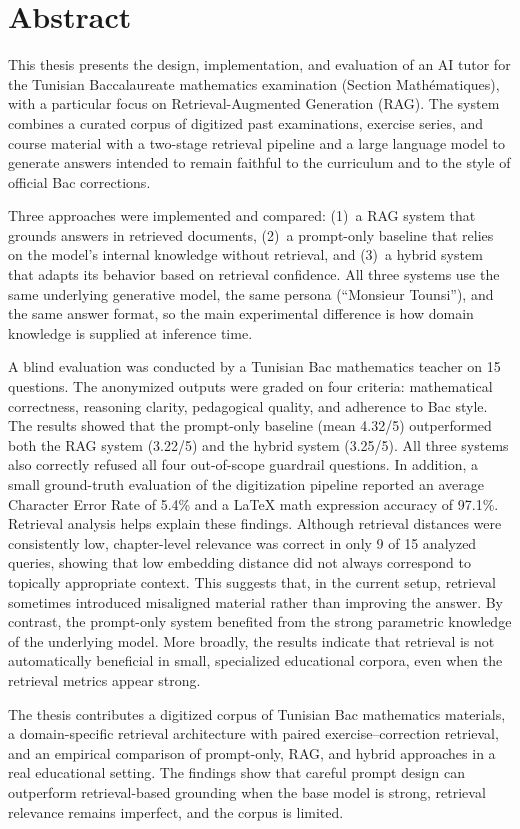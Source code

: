 \chapter*{Abstract}

This thesis presents the design, implementation, and evaluation of an AI tutor for the Tunisian Baccalaureate mathematics examination (Section Math\'{e}matiques), with a particular focus on Retrieval-Augmented Generation (RAG). The system combines a curated corpus of digitized past examinations, exercise series, and course material with a two-stage retrieval pipeline and a large language model to generate answers intended to remain faithful to the curriculum and to the style of official Bac corrections.

Three approaches were implemented and compared: (1)~a RAG system that grounds answers in retrieved documents, (2)~a prompt-only baseline that relies on the model's internal knowledge without retrieval, and (3)~a hybrid system that adapts its behavior based on retrieval confidence. All three systems use the same underlying generative model, the same persona (``Monsieur Tounsi''), and the same answer format, so the main experimental difference is how domain knowledge is supplied at inference time.

A blind evaluation was conducted by a Tunisian Bac mathematics teacher on 15 questions. The anonymized outputs were graded on four criteria: mathematical correctness, reasoning clarity, pedagogical quality, and adherence to Bac style. The results showed that the prompt-only baseline (mean 4.32/5) outperformed both the RAG system (3.22/5) and the hybrid system (3.25/5). All three systems also correctly refused all four out-of-scope guardrail questions. In addition, a small ground-truth evaluation of the digitization pipeline reported an average Character Error Rate of 5.4\% and a \LaTeX{} math expression accuracy of 97.1\%. Retrieval analysis helps explain these findings. Although retrieval distances were consistently low, chapter-level relevance was correct in only 9 of 15 analyzed queries, showing that low embedding distance did not always correspond to topically appropriate context. This suggests that, in the current setup, retrieval sometimes introduced misaligned material rather than improving the answer. By contrast, the prompt-only system benefited from the strong parametric knowledge of the underlying model. More broadly, the results indicate that retrieval is not automatically beneficial in small, specialized educational corpora, even when the retrieval metrics appear strong.

The thesis contributes a digitized corpus of Tunisian Bac mathematics materials, a domain-specific retrieval architecture with paired exercise--correction retrieval, and an empirical comparison of prompt-only, RAG, and hybrid approaches in a real educational setting. The findings show that careful prompt design can outperform retrieval-based grounding when the base model is strong, retrieval relevance remains imperfect, and the corpus is limited.
